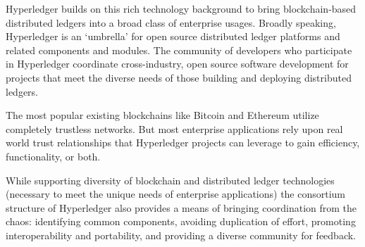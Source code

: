 Hyperledger builds on this rich technology background to bring blockchain-based distributed ledgers into a broad class of enterprise usages.  Broadly speaking, Hyperledger is an `umbrella' for open source distributed ledger platforms and related components and modules. The community of developers who participate in Hyperledger coordinate cross-industry, open source software development for projects that meet the diverse needs of those building and deploying distributed ledgers. 

The most popular existing blockchains like Bitcoin and Ethereum utilize completely trustless networks.  But most enterprise applications rely upon real world trust relationships that Hyperledger projects can leverage to gain efficiency, functionality, or both.

While supporting diversity of blockchain and distributed ledger technologies (necessary to meet the unique needs of enterprise applications) the consortium structure of Hyperledger also provides a means of bringing coordination from the chaos: identifying common components, avoiding duplication of effort, promoting interoperability and portability, and providing a diverse community for feedback.
\newpage


